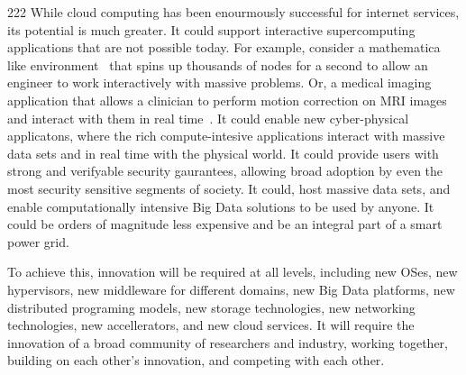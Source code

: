 222
While cloud computing has been enourmously successful for internet
services, its potential is much greater.  It could support interactive
supercomputing applications that are not possible today. For example,
consider a mathematica like environment~\cite{julia} that spins up
thousands of nodes for a second to allow an engineer to work
interactively with massive problems.  Or, a medical imaging
application that allows a clinician to perform motion correction on
MRI images and interact with them in real time~\cite{ebbrt}.  It could
enable new cyber-physical applicatons, where the rich compute-intesive
applications interact with massive data sets and in real time with the
physical world.  It could provide users with strong and verifyable
security gaurantees, allowing broad adoption by even the most security
sensitive segments of society.  It could, host massive data sets, and
enable computationally intensive Big Data solutions to be used by
anyone.  It could be orders of magnitude less expensive and be an
integral part of a smart power grid.

To achieve this, innovation will be required at all levels, including
new OSes, new hypervisors, new middleware for different domains, new
Big Data platforms, new distributed programing models, new storage technologies,
new networking technologies, new accellerators, and new cloud 
services.  It will require the innovation of a broad community of
researchers and industry, working together, building on each other's
innovation, and competing with each other.

